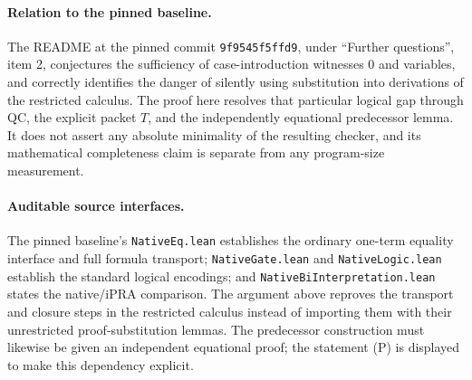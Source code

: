 \paragraph{Relation to the pinned baseline.}
The README at the pinned commit
\texttt{9f9545f5ffd9},
under ``Further questions'', item 2, conjectures the sufficiency of
case-introduction witnesses $0$ and variables, and correctly identifies
the danger of silently using substitution into derivations of the
restricted calculus.  The proof here resolves that particular logical
gap through QC, the explicit packet $T$, and the independently
equational predecessor lemma.  It does not assert any absolute
minimality of the resulting checker, and its mathematical completeness
claim is separate from any program-size measurement.

\paragraph{Auditable source interfaces.}
The pinned baseline's \texttt{NativeEq.lean} establishes the ordinary
one-term equality interface and full formula transport;
\texttt{NativeGate.lean} and \texttt{NativeLogic.lean} establish the
standard logical encodings; and \texttt{NativeBiInterpretation.lean}
states the native/iPRA comparison.  The argument above reproves the
transport and closure steps in the restricted calculus instead of
importing them with their unrestricted proof-substitution lemmas.
The predecessor construction must likewise be given an independent
equational proof; the statement (P) is displayed to make this
dependency explicit.
